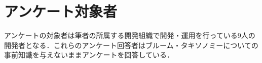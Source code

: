 \section{アンケート対象者}
アンケートの対象者は筆者の所属する開発組織で開発・運用を行っている9人の開発者となる．これらのアンケート回答者はブルーム・タキソノミーについての事前知識を与えないままアンケートを回答している．
